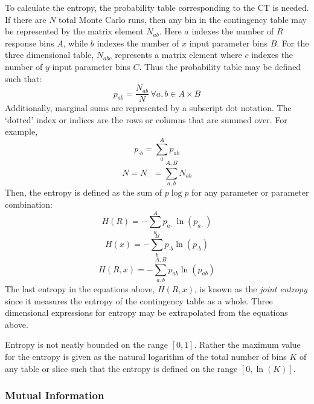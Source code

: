 \documentclass[a4paper, 12pt]{article}
\begin{document}
To calculate the entropy, the probability table corresponding to the CT is needed.  If there are $N$ total Monte Carlo runs, then any bin in
the contingency table may be represented by the matrix element $N_{ab}$.  Here $a$ indexes the number of $R$ response bins $A$, while $b$
indexes the number of $x$ input parameter bins $B$.  For the three dimensional table, $N_{abc}$ represents a matrix element where $c$ indexes the number of $y$
input parameter bins $C$.  Thus the probability table may be defined such that:
\begin{equation} p_{ab} = \frac{N_{ab}}{N} \, \forall a, b\in A\times B\end{equation}
Additionally, marginal sums are represented by a subscript dot notation.  The `dotted' index or indices are the rows or columns that are summed over.  For example,
\begin{equation} p_{\cdot b} = \sum_a^A p_{ab} \end{equation}
\begin{equation} N = N_{\cdot \cdot} = \sum_{a,b}^{A,B} N_{ab} \end{equation}
Then, the entropy is defined as the sum of $p\log p$ for any parameter or parameter combination:
\begin{equation} H(R) = - \sum_a^A p_{a \cdot} \ln(p_{a \cdot}) \end{equation}
\begin{equation} H(x) = - \sum_b^B p_{\cdot b} \ln(p_{\cdot b}) \end{equation}
\begin{equation} H(R,x) = - \sum_{a,b}^{A,B} p_{ab} \ln(p_{ab}) \end{equation}
The last entropy in the equations above, $H(R,x)$, is known as the \emph{joint entropy} since it measures the entropy of the contingency table as a whole.
Three dimensional expressions for entropy may be extrapolated from the equations above.

Entropy is not neatly bounded on the range $[0,1]$.
Rather the maximum value for the entropy is given as the natural logarithm of the total number of bins $K$ of any table or slice such that
the entropy is defined on the range $[0, \ln(K)]$.

\subsubsection{Mutual Information}
\label{sec:mutual_information}
\end{document}
